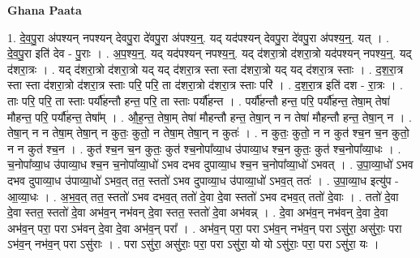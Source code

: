 \documentclass[17pt]{extarticle}
\begin{document}
\textbf{Ghana Paata } \newline

1. दे॒व॒पु॒रा अ॑पश्यन् नपश्यन् देवपु॒रा दे॑वपु॒रा अ॑पश्य॒न्॒. यद् यद॑पश्यन् देवपु॒रा दे॑वपु॒रा अ॑पश्य॒न्॒. यत् । . दे॒व॒पु॒रा इति॑ देव - पु॒राः । . अ॒प॒श्य॒न्॒. यद् यद॑पश्यन् नपश्य॒न्॒. यद् द॑शरा॒त्रो द॑शरा॒त्रो यद॑पश्यन् नपश्य॒न्॒. यद् द॑शरा॒त्रः । . यद् द॑शरा॒त्रो द॑शरा॒त्रो यद् यद् द॑शरा॒त्र स्ता स्ता द॑शरा॒त्रो यद् यद् द॑शरा॒त्र स्ताः । . द॒श॒रा॒त्र स्ता स्ता द॑शरा॒त्रो द॑शरा॒त्र स्ताः परि॒ परि॒ ता द॑शरा॒त्रो द॑शरा॒त्र स्ताः परि॑ । . द॒श॒रा॒त्र इति॑ दश - रा॒त्रः । . ताः परि॒ परि॒ ता स्ताः पर्यौ॑हन्तौ हन्त॒ परि॒ ता स्ताः पर्यौ॑हन्त । . पर्यौ॑हन्तौ हन्त॒ परि॒ पर्यौ॑हन्त॒ तेषा॒म् तेषा॑ मौहन्त॒ परि॒ पर्यौ॑हन्त॒ तेषा᳚म् । . औ॒ह॒न्त॒ तेषा॒म् तेषा॑ मौहन्तौ हन्त॒ तेषा॒न् न न तेषा॑ मौहन्तौ हन्त॒ तेषा॒न् न । . तेषा॒न् न न तेषा॒म् तेषा॒न् न कुतः॒ कुतो॒ न तेषा॒म् तेषा॒न् न कुतः॑ । . न कुतः॒ कुतो॒ न न कुत॑ श्च॒न च॒न कुतो॒ न न कुत॑ श्च॒न । . कुत॑ श्च॒न च॒न कुतः॒ कुत॑ श्च॒नोपा᳚व्या॒ध उ॑पाव्या॒ध श्च॒न कुतः॒ कुत॑ श्च॒नोपा᳚व्या॒धः । . च॒नोपा᳚व्या॒ध उ॑पाव्या॒ध श्च॒न च॒नोपा᳚व्या॒धो॑ ऽभव दभव दुपाव्या॒ध श्च॒न च॒नोपा᳚व्या॒धो॑ ऽभवत् । . उ॒पा॒व्या॒धो॑ ऽभव दभव दुपाव्या॒ध उ॑पाव्या॒धो॑ ऽभव॒त् तत॒ स्ततो॑ ऽभव दुपाव्या॒ध उ॑पाव्या॒धो॑ ऽभव॒त् ततः॑ । . उ॒पा॒व्या॒ध इत्यु॑प - आ॒व्या॒धः । . अ॒भ॒व॒त् तत॒ स्ततो॑ ऽभव दभव॒त् ततो॑ दे॒वा दे॒वा स्ततो॑ ऽभव दभव॒त् ततो॑ दे॒वाः । . ततो॑ दे॒वा दे॒वा स्तत॒ स्ततो॑ दे॒वा अभ॑व॒न् नभ॑वन् दे॒वा स्तत॒ स्ततो॑ दे॒वा अभ॑वन्न् । . दे॒वा अभ॑व॒न् नभ॑वन् दे॒वा दे॒वा अभ॑व॒न् परा॒ परा ऽभ॑वन् दे॒वा दे॒वा अभ॑व॒न् परा᳚ । . अभ॑व॒न् परा॒ परा ऽभ॑व॒न् नभ॑व॒न् परा ऽसु॑रा॒ असु॑राः॒ परा ऽभ॑व॒न् नभ॑व॒न् परा ऽसु॑राः । . परा ऽसु॑रा॒ असु॑राः॒ परा॒ परा ऽसु॑रा॒ यो यो ऽसु॑राः॒ परा॒ परा ऽसु॑रा॒ यः । \newline
\end{document}
